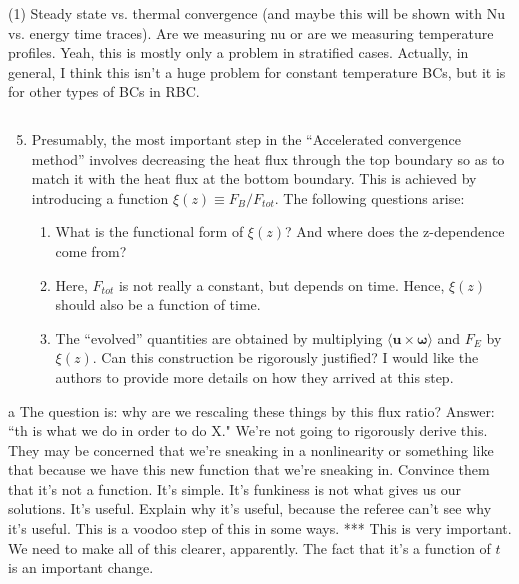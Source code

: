 \documentclass[aps, 11pt, singlecolumn]{revtex4-1} %
\begin{document}
\begin{singlespace}
\begin{myquotation}
\begin{enumerate}
\end{enumerate}
\end{myquotation}
(1) Steady state vs. thermal convergence (and maybe this will be shown with Nu vs. energy time traces). Are we measuring nu or are we measuring temperature profiles.
Yeah, this is mostly only a problem in stratified cases. Actually, in general, I think this isn't a huge problem for constant temperature BCs, but it is for other types of BCs in RBC.
\begin{myquotation}
$\,$\\\vspace{-1.25cm}
\begin{enumerate}
\setcounter{enumi}{4}
\item Presumably, the most important step in the “Accelerated convergence method” involves decreasing the heat flux through the top boundary so as to match it with the heat flux at the bottom boundary. This is achieved by introducing a function $\xi(z) \equiv  F_B/F_{tot}$. The following questions arise:
\begin{enumerate}
\item What is the functional form of $\xi(z)$? And where does the z-dependence come from?
\item Here, $F_{tot}$ is not really a constant, but depends on time. Hence, $\xi(z)$ should also be a function of time.
\item The “evolved” quantities are obtained by multiplying $\langle \bm{u} \times \bm{\omega} \rangle$ and $F_E$ by $\xi(z)$. Can this construction be rigorously justified? I would like the authors to provide more details on how they arrived at this step.
\end{enumerate}
\end{enumerate}
\end{myquotation}a
The question is: why are we rescaling these things by this flux ratio? Answer: ``th
is what we do in order to do X." We're not going to rigorously derive this. They
may be concerned that we're sneaking in a nonlinearity or something like that
because we have this new function that we're sneaking in. Convince them that it's
not a function. It's simple. It's funkiness is not what gives us our solutions.
It's useful. Explain why it's useful, because the referee can't see why it's useful. This is a voodoo step of this in some ways.
*** This is very important.
We need to make all of this clearer, apparently. The fact that it's a function of $t$ is an important change.
\begin{myquotation}

\end{myquotation}
\end{singlespace}
\end{document}
